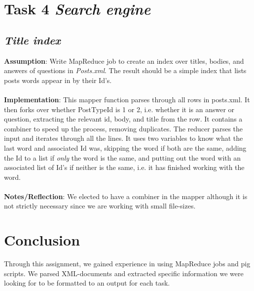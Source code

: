 \documentclass[fleqn,10pt]{wlscirep}
\begin{document}
\section{Task 4 \emph{Search engine}}
\subsection{\emph{Title index}}
\textbf{Assumption}: Write MapReduce job to create an index over titles, bodies, and answers of questions in \textit{Posts.xml}. The result should be a simple index that lists posts words appear in by their Id's. \\ \\
\textbf{Implementation}: This mapper function parses through all rows in posts.xml. It then forks over whether PostTypeId is 1 or 2, i.e. whether it is an answer or question, extracting the relevant id, body, and title from the row. It contains a combiner to speed up the process, removing duplicates. The reducer parses the input and iterates through all the lines. It uses two variables to know what the last word and associated Id was, skipping the word if both are the same, adding the Id to a list if \textit{only} the word is the same, and putting out the word with an associated list of Id's if neither is the same, i.e. it has finished working with the word. \\ \\
\textbf{Notes/Reflection}: We elected to have a combiner in the mapper although it is not strictly necessary since we are working with small file-sizes.




\section{Conclusion}
Through this assignment, we gained experience in using MapReduce jobs and pig scripts. We parsed XML-documents and extracted specific information we were looking for to be formatted to an output for each task.



\end{document}
